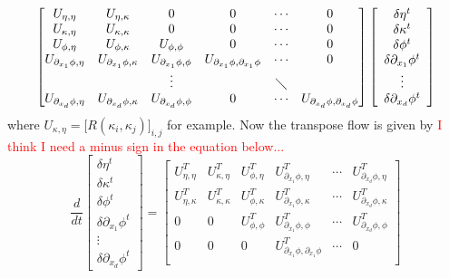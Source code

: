 \documentclass[noinfoline]{imsart}
\begin{document}
{\begin{equation}
\begin{bmatrix}
U_{\eta,\eta} & U_{\eta,\kappa} & 0 &  0 & \cdots  &  0\\
U_{\kappa,\eta} & U_{\kappa,\kappa} & 0 &  0 & \cdots  &  0\\
U_{\phi,\eta} & U_{\phi,\kappa} & U_{\phi,\phi} & 0 & \cdots  &  0\\
U_{\partial_{x_1} \phi,\eta} & U_{\partial_{x_1} \phi,\kappa} & U_{\partial_{x_1} \phi,\phi} & U_{\partial_{x_1} \phi,\partial_{x_1} \phi} & \cdots  & 0 \\
&&\vdots & &\diagdown& \\
U_{\partial_{x_d} \phi,\eta} & U_{\partial_{x_d} \phi,\kappa} & U_{\partial_{x_d} \phi,\phi} & 0 & \cdots  & U_{\partial_{x_d} \phi,\partial_{x_d} \phi} 
\end{bmatrix}
  \left[\begin{array}{c} \delta\eta^t\\ \delta \kappa^t \\ \delta\phi^t \\ \delta\partial_{x_1} \phi^t \\ \vdots \\ \delta\partial_{x_d} \phi^t \end{array}\right]
\end{equation}
where $U_{\kappa,\eta}= \bigl[ R(\kappa_i,\kappa_j) \bigr]_{i,j}$ for example. Now the transpose flow is given by \textcolor{red}{I think I need a minus sign in the equation below...}
\begin{equation}
\frac{d}{dt} \left[\begin{array}{c} \delta\eta^t\\ \delta \kappa^t \\ \delta\phi^t \\ \delta\partial_{x_1} \phi^t  \\ \vdots \\ \delta\partial_{x_d} \phi^t   \end{array}\right]
= 
\begin{bmatrix}
U_{\eta,\eta}^T   & U_{\kappa,\eta}^T & U_{\phi,\eta}^T &  U_{\partial_{x_1} \phi,\eta}^T & \cdots  &  U_{\partial_{x_d} \phi,\eta}^T \\
U_{\eta,\kappa}^T & U_{\kappa,\kappa}^T & U_{\phi,\kappa}^T &  U_{\partial_{x_1} \phi,\kappa}^T & \cdots  &  U_{\partial_{x_d} \phi,\kappa}^T\\
0 & 0 & U_{\phi,\phi}^T & U_{\partial_{x_1} \phi,\phi}^T & \cdots  &  U_{\partial_{x_d} \phi,\phi}^T\\
0 & 0 & 0 & U_{\partial_{x_1} \phi,\partial_{x_1} \phi}^T & \cdots  & 0 \\

\end{bmatrix}
\end{equation}}
\end{document}
